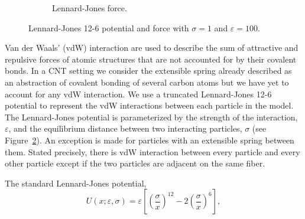 \begin{figure}[t!]
\begin{subfigure}[t]{.5\textwidth}
			\caption{Lennard-Jones force. \label{subfig:LJForce}}
		\end{subfigure}		
		\caption{Lennard-Jones 12-6 potential and force with $\sigma = 1$ and $\varepsilon = 100$.\label{fig:LJ}}	
	\end{figure}

   Van der Waals' (vdW) interaction are used to describe the sum of attractive and repulsive forces of atomic structures that are not accounted for by their covalent bonds. In a CNT setting we consider the extensible spring already described as an abstraction of covalent bonding of several carbon atoms but we have yet to account for any vdW interaction. We use a truncated Lennard-Jones 12-6 potential to represent the vdW interactions between each particle in the model. The Lennard-Jones potential is parameterized by the strength of the interaction, $\varepsilon$, and the equilibrium distance between two interacting particles, $\sigma$ (see Figure~\ref{fig:LJ}). An exception is made for particles with an extensible spring between them. Stated precisely, there is vdW interaction between every particle and every other particle except if the two particles are adjacent on the same fiber.
	
The standard Lennard-Jones potential,
\begin{equation}
	U(x; \varepsilon, \sigma) = \varepsilon \left[ \left( \frac{\sigma}{x} \right)^{12} - 2 \left( \frac{\sigma}{x} \right)^6 \right],
\end{equation}

